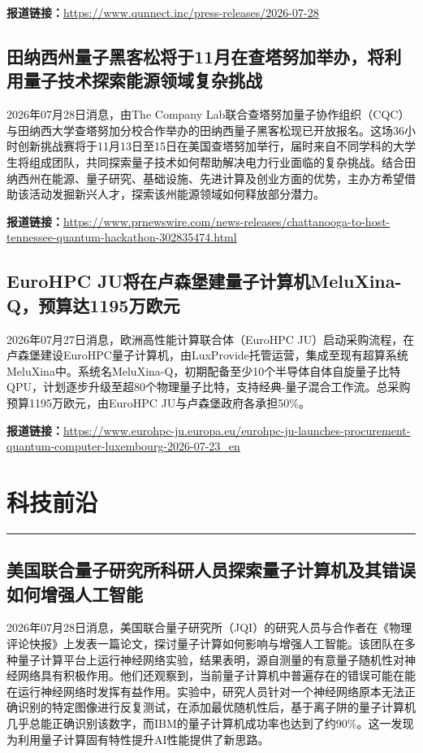 \documentclass[12pt,a4paper]{ctexart}
\begin{document}
\noindent\textbf{报道链接：}\url{https://www.qunnect.inc/press-releases/2026-07-28}

\subsection{ 田纳西州量子黑客松将于11月在查塔努加举办，将利用量子技术探索能源领域复杂挑战 }

2026年07月28日消息，由The Company Lab联合查塔努加量子协作组织（CQC）与田纳西大学查塔努加分校合作举办的田纳西量子黑客松现已开放报名。这场36小时创新挑战赛将于11月13日至15日在美国查塔努加举行，届时来自不同学科的大学生将组成团队，共同探索量子技术如何帮助解决电力行业面临的复杂挑战。结合田纳西州在能源、量子研究、基础设施、先进计算及创业方面的优势，主办方希望借助该活动发掘新兴人才，探索该州能源领域如何释放部分潜力。

\noindent\textbf{报道链接：}\url{https://www.prnewswire.com/news-releases/chattanooga-to-host-tennessee-quantum-hackathon-302835474.html}

\subsection{ EuroHPC JU将在卢森堡建量子计算机MeluXina-Q，预算达1195万欧元 }

2026年07月27日消息，欧洲高性能计算联合体（EuroHPC JU）启动采购流程，在卢森堡建设EuroHPC量子计算机，由LuxProvide托管运营，集成至现有超算系统MeluXina中。系统名MeluXina-Q，初期配备至少10个半导体自体自旋量子比特QPU，计划逐步升级至超80个物理量子比特，支持经典-量子混合工作流。总采购预算1195万欧元，由EuroHPC JU与卢森堡政府各承担50\%。

\noindent\textbf{报道链接：}\url{https://www.eurohpc-ju.europa.eu/eurohpc-ju-launches-procurement-quantum-computer-luxembourg-2026-07-23\_en}


\newpage
\section{科技前沿}
\vspace{-0.5em}
\noindent\rule{\linewidth}{1.5pt}

\subsection{ 美国联合量子研究所科研人员探索量子计算机及其错误如何增强人工智能 }

2026年07月28日消息，美国联合量子研究所（JQI）的研究人员与合作者在《物理评论快报》上发表一篇论文，探讨量子计算如何影响与增强人工智能。该团队在多种量子计算平台上运行神经网络实验，结果表明，源自测量的有意量子随机性对神经网络具有积极作用。他们还观察到，当前量子计算机中普遍存在的错误可能在能在运行神经网络时发挥有益作用。实验中，研究人员针对一个神经网络原本无法正确识别的特定图像进行反复测试，在添加最优随机性后，基于离子阱的量子计算机几乎总能正确识别该数字，而IBM的量子计算机成功率也达到了约90\%。这一发现为利用量子计算固有特性提升AI性能提供了新思路。
\end{document}

